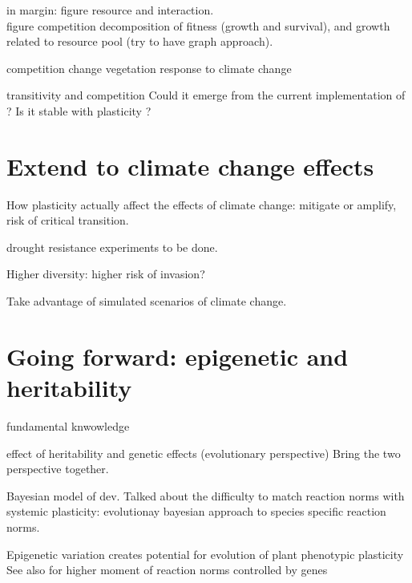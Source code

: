 in margin: figure resource and interaction.\\
figure competition decomposition of fitness (growth and survival), and growth related to resource pool (try to have graph approach).

competition change vegetation response to climate change \parencite{van_loon_how_2014}

transitivity and competition \cite{levine_beyond_2017} Could it emerge from the current implementation of \model ? Is it stable with plasticity ?


\section{Extend to climate change effects}

How plasticity actually affect the effects of climate change: mitigate or amplify, risk of critical transition.

drought resistance experiments to be done.

Higher diversity: higher risk of invasion?

Take advantage of simulated scenarios of climate change.

\section{Going forward: epigenetic and heritability}

fundamental knwowledge 

effect of heritability and genetic effects (evolutionary perspective) Bring the two perspective together. \cite{scheiner_genetics_1989}

Bayesian model of dev. \cite{stamps_bayesian_2016} Talked about the difficulty to match reaction norms with systemic plasticity: evolutionay bayesian approach to species specific reaction norms.

Epigenetic variation creates potential for evolution of plant phenotypic plasticity \cite{zhang_epigenetic_2013}
See also \cite{dewitt_expanding_2016} for higher moment of reaction norms controlled by genes